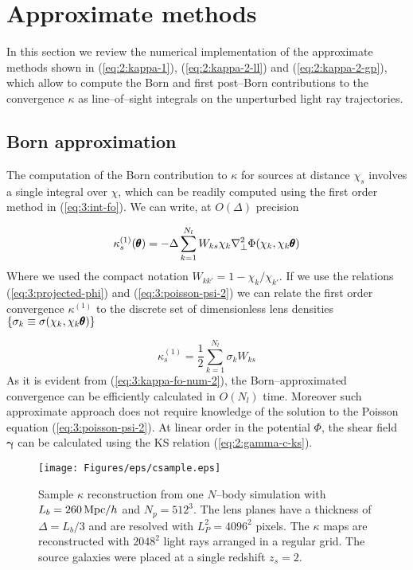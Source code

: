 \section{Approximate methods}
In this section we review the numerical implementation of the approximate methods shown in (\ref{eq:2:kappa-1}), (\ref{eq:2:kappa-2-ll}) and (\ref{eq:2:kappa-2-gp}), which allow to compute the Born and first post--Born contributions to the convergence $\kappa$ as line--of--sight integrals on the unperturbed light ray trajectories. 

\subsection{Born approximation}
The computation of the Born contribution to $\kappa$ for sources at distance $\chi_s$ involves a single integral over $\chi$, which can be readily computed using the first order method in (\ref{eq:3:int-fo}). We can write, at $O(\Delta)$ precision 

\begin{equation}
\label{eq:3:kappa-fo-num-1}
\kappa^{(1)}_s(\pmb{\theta}) = -\Delta\sum_{k=1}^{N_l} W_{ks}\chi_k\nabla^2_\perp\Phi(\chi_k,\chi_k\pmb{\theta})
\end{equation} 
%
Where we used the compact notation $W_{kk'}=1-\chi_k/\chi_{k'}$. If we use the relations (\ref{eq:3:projected-phi}) and (\ref{eq:3:poisson-psi-2}) we can relate the first order convergence $\kappa^{(1)}$ to the discrete set of dimensionless lens densities $\{\sigma_k\equiv\sigma(\chi_k,\chi_k\pmb{\theta})\}$

\begin{equation}
\label{eq:3:kappa-fo-num-2}
\kappa^{(1)}_s = \frac{1}{2}\sum_{k=1}^{N_l} \sigma_k W_{ks}
\end{equation}
%
As it is evident from (\ref{eq:3:kappa-fo-num-2}), the Born--approximated convergence can be efficiently calculated in $O(N_l)$ time. Moreover such approximate approach does not require knowledge of the solution to the Poisson equation (\ref{eq:3:poisson-psi-2}). At linear order in the potential $\Phi$, the shear field $\pmb{\gamma}$ can be calculated using the KS relation (\ref{eq:2:gamma-c-ks}).  

\begin{figure}
\begin{center}
\texttt{[image: Figures/eps/csample.eps]}
\end{center}
\caption{Sample $\kappa$ reconstruction from one $N$--body simulation with $L_b=260\,{\rm Mpc}/h$ and $N_p=512^3$. The lens planes have a thickness of $\Delta=L_b/3$ and are resolved with $L_P^2=4096^2$ pixels. The $\kappa$ maps are reconstructed with $2048^2$ light rays arranged in a regular grid. The source galaxies were placed at a single redshift $z_s=2$.}
\label{fig:3:csample}
\end{figure}

